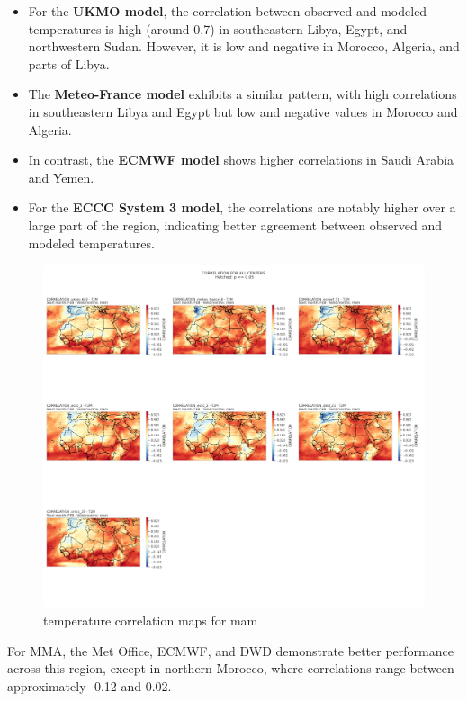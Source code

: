 \begin{itemize}
    \item For the \textbf{UKMO model}, the correlation between observed and modeled temperatures is high (around 0.7) in southeastern Libya, Egypt, and northwestern Sudan. However, it is low and negative in Morocco, Algeria, and parts of Libya.
    \item The \textbf{Meteo-France model} exhibits a similar pattern, with high correlations in southeastern Libya and Egypt but low and negative values in Morocco and Algeria.
    \item In contrast, the \textbf{ECMWF model} shows higher correlations in Saudi Arabia and Yemen.
    \item For the \textbf{ECCC System 3 model}, the correlations are notably higher over a large part of the region, indicating better agreement between observed and modeled temperatures.
\end{itemize}
\begin{figure}[H]
    \centering
    \includegraphics[width=1\linewidth]{plots/det/corr/CORR_mam_t2m.png}
    \caption{temperature correlation maps for mam}
\end{figure}
For MMA, the Met Office, ECMWF, and DWD demonstrate better performance across this region, except in northern Morocco, where correlations range between approximately -0.12 and 0.02.
